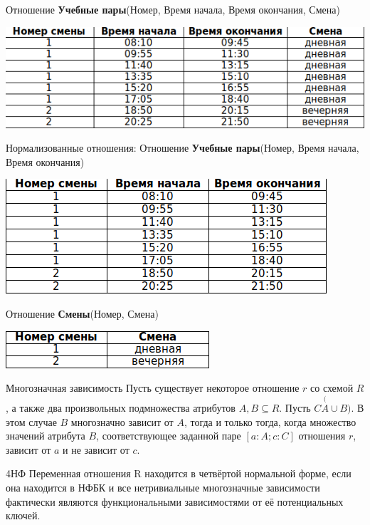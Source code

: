 \documentclass{beamer}
\begin{document}
\begin{frame}
Отношение \textbf{Учебные пары}(Номер, Время начала, Время окончания, Смена)
\begin{center}
\includegraphics[scale=1]{images/ex-rasp-08.png}
\end{center}
Нормализованные отношения:
Отношение \textbf{Учебные пары}(Номер, Время начала, Время окончания)
\begin{center}
\includegraphics[scale=1]{images/ex-rasp-09.png}
\end{center}
Отношение \textbf{Смены}(Номер, Смена)
\begin{center}
\includegraphics[scale=1]{images/ex-rasp-10.png}
\end{center}
\end{frame}

\begin{frame}
\begin{block}{Многозначная зависимость}
Пусть существует некоторое отношение $r$ со схемой $R$, а также два произвольных подмножества атрибутов $A,B\subseteq R$. Пусть $C \overset (A\cup B)$.
В этом случае $B$ многозначно зависит от $A$, тогда и только тогда, когда множество значений атрибута $B$, соответствующее заданной паре $[a:A;c:C]$ отношения $r$, зависит от $a$ и не зависит от $c$. 
\end{block}
\begin{block}{4НФ}
Переменная отношения R находится в четвёртой нормальной форме, если она находится в НФБК и все нетривиальные многозначные зависимости фактически являются функциональными зависимостями от её потенциальных ключей. 
\end{block}
\end{frame}
\end{document}
